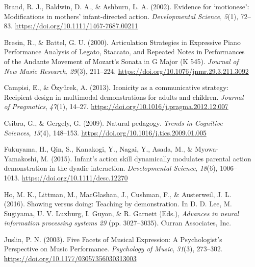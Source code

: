 \documentclass[
  english,
  man,floatsintext]{apa6}
\newlength{\cslhangindent}
\newenvironment{CSLReferences}[2] %
 {%
  \setlength{\parindent}{0pt}
  \ifodd #1 \everypar{\setlength{\hangindent}{\cslhangindent}}\ignorespaces\fi
  \ifnum #2 > 0
  \setlength{\parskip}{#2\baselineskip}
  \fi
 }%
 {}
\begin{document}
\hypertarget{refs}{}
\begin{CSLReferences}{1}{0}
\leavevmode{}%
Brand, R. J., Baldwin, D. A., \& Ashburn, L. A. (2002). Evidence for {`motionese'}: Modifications in mothers' infant-directed action. \emph{Developmental Science}, \emph{5}(1), 72--83. \url{https://doi.org/10.1111/1467-7687.00211}

\leavevmode{}%
Bresin, R., \& Battel, G. U. (2000). Articulation {Strategies} in {Expressive Piano Performance Analysis} of {Legato}, {Staccato}, and {Repeated Notes} in {Performances} of the {Andante Movement} of {Mozart}'s {Sonata} in {G Major} ({K} 545). \emph{Journal of New Music Research}, \emph{29}(3), 211--224. \url{https://doi.org/10.1076/jnmr.29.3.211.3092}

\leavevmode{}%
Campisi, E., \& Özyürek, A. (2013). Iconicity as a communicative strategy: {Recipient} design in multimodal demonstrations for adults and children. \emph{Journal of Pragmatics}, \emph{47}(1), 14--27. \url{https://doi.org/10.1016/j.pragma.2012.12.007}

\leavevmode{}%
Csibra, G., \& Gergely, G. (2009). Natural pedagogy. \emph{Trends in Cognitive Sciences}, \emph{13}(4), 148--153. \url{https://doi.org/10.1016/j.tics.2009.01.005}

\leavevmode{}%
Fukuyama, H., Qin, S., Kanakogi, Y., Nagai, Y., Asada, M., \& Myowa-Yamakoshi, M. (2015). Infant's action skill dynamically modulates parental action demonstration in the dyadic interaction. \emph{Developmental Science}, \emph{18}(6), 1006--1013. \url{https://doi.org/10.1111/desc.12270}

\leavevmode{}%
Ho, M. K., Littman, M., MacGlashan, J., Cushman, F., \& Austerweil, J. L. (2016). Showing versus doing: {Teaching} by demonstration. In D. D. Lee, M. Sugiyama, U. V. Luxburg, I. Guyon, \& R. Garnett (Eds.), \emph{Advances in neural information processing systems 29} (pp. 3027--3035). {Curran Associates, Inc.}

\leavevmode{}%
Juslin, P. N. (2003). Five {Facets} of {Musical Expression}: {A Psychologist}'s {Perspective} on {Music Performance}. \emph{Psychology of Music}, \emph{31}(3), 273--302. \url{https://doi.org/10.1177/03057356030313003}


\end{CSLReferences}
\end{document}
